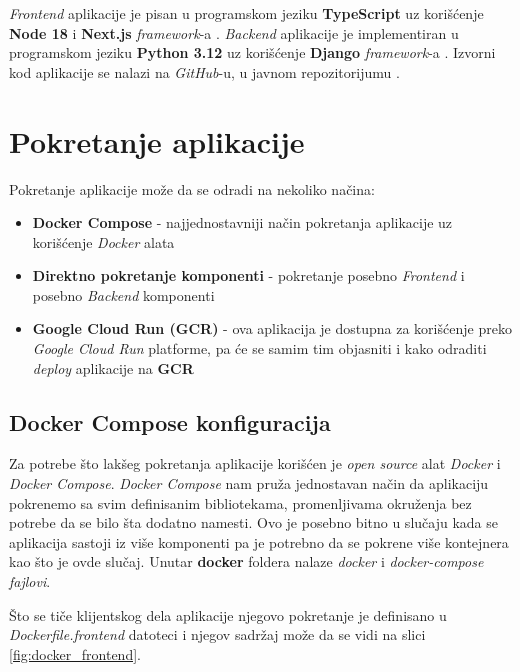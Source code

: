 \documentclass[12pt,oneside]{memoir}
\begin{document}
\emph{Frontend} aplikacije je pisan u programskom jeziku \textbf{TypeScript} \cite{typescript} uz korišćenje \textbf{Node 18} \cite{node} i \textbf{Next.js} \emph{framework}-a \cite{next}.
\emph{Backend} aplikacije je implementiran u programskom jeziku \textbf{Python 3.12} \cite{python} uz korišćenje \textbf{Django} \emph{framework}-a \cite{django}. Izvorni kod aplikacije se nalazi na \emph{GitHub}-u, u javnom repozitorijumu \cite{github}.

\section{Pokretanje aplikacije}

Pokretanje aplikacije može da se odradi na nekoliko načina:
\begin{itemize}
    \item \textbf{Docker Compose} \cite{docker_compose} - najjednostavniji način pokretanja aplikacije uz korišćenje \emph{Docker} alata \cite{docker}
    \item \textbf{Direktno pokretanje komponenti} - pokretanje posebno \emph{Frontend} i posebno \emph{Backend} komponenti
    \item \textbf{Google Cloud Run (GCR)} \cite{gcr} - ova aplikacija je dostupna za korišćenje preko \emph{Google Cloud Run} platforme, pa će se samim tim objasniti i kako odraditi \emph{deploy} aplikacije na \textbf{GCR}
\end{itemize}

\subsection{Docker Compose konfiguracija}
Za potrebe što lakšeg pokretanja aplikacije korišćen je \emph{open source} alat \emph{Docker} i \emph{Docker Compose}. \emph{Docker Compose} nam pruža jednostavan način da aplikaciju pokrenemo sa svim definisanim bibliotekama, promenljivama okruženja bez potrebe da se bilo šta dodatno namesti. Ovo je posebno bitno u slučaju kada se aplikacija sastoji iz više komponenti pa je potrebno da se pokrene više kontejnera kao što je ovde slučaj.
Unutar \textbf{docker} foldera nalaze \emph{docker} i \emph{docker-compose fajlovi}.

Što se tiče klijentskog dela aplikacije njegovo pokretanje je definisano u \emph{Dockerfile.frontend} datoteci i njegov sadržaj može da se vidi na slici \ref{fig:docker_frontend}.
\end{document}
